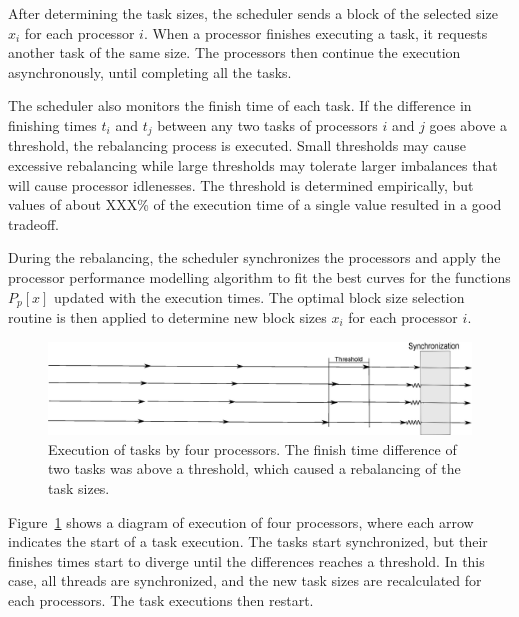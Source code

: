 \documentclass[journal]{IEEEtran}
\begin{document}
After determining the task sizes, the scheduler sends a block of the selected
size $x_i$ for each processor $i$. When a processor finishes executing a task,
it requests another task of the same size. The processors then continue the
execution asynchronously, until completing all the tasks.

The scheduler also monitors the finish time of each task. If the difference in
finishing times $t_i$ and $t_j$ between any two tasks of processors $i$ and $j$
goes above a threshold, the rebalancing process is executed. Small thresholds
may cause excessive rebalancing while large thresholds may tolerate larger
imbalances that will cause processor idlenesses. The threshold is determined
empirically, but values of about XXX\% of the execution time of a single value
resulted in a good tradeoff.

During the rebalancing, the scheduler synchronizes the processors and apply the
processor performance modelling algorithm to fit the best curves for the
functions $P_p[x]$ updated with the execution times. The optimal block size
selection routine is then applied to determine new block sizes $x_i$ for each
processor $i$.

\begin{figure}[!t]
	\centering
			\includegraphics[scale=0.24]{DiagramaArtigo.eps}
	\caption{Execution of tasks by four processors. The finish time
          difference of two tasks was above a threshold, which caused a
          rebalancing of the task sizes.}
	\label{fig:Diagrama}
\end{figure}


Figure~\ref{fig:Diagrama} shows a diagram of execution of four processors, where
each arrow indicates the start of a task execution. The tasks start
synchronized, but their finishes times start to diverge until the differences
reaches a threshold. In this case, all threads are synchronized, and the new
task sizes are recalculated for each processors. The task executions then
restart.
\end{document}
